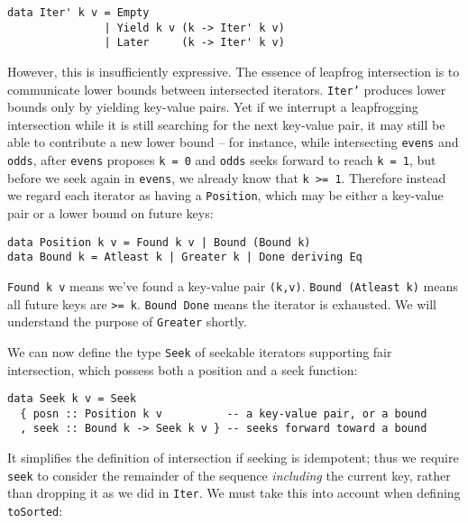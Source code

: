 \documentclass[acmsmall,screen,review,anonymous,dvipsnames,svgnames]{acmart}
\newcommand\hask[1]{\texttt{#1}}
\newcommand\ttt\texttt
\begin{document}
\begin{verbatim}
data Iter' k v = Empty
               | Yield k v (k -> Iter' k v)
               | Later     (k -> Iter' k v)
\end{verbatim}

\noindent
However, this is insufficiently expressive.
The essence of leapfrog intersection is to communicate lower bounds between intersected iterators.
\hask{Iter'} produces lower bounds only by yielding key-value pairs.
Yet if we interrupt a leapfrogging intersection while it is still searching for the next key-value pair, it may still be able to contribute a new lower bound -- for instance, while intersecting \ttt{evens} and \ttt{odds}, after \ttt{evens} proposes \ttt{k = 0} and \ttt{odds} seeks forward to reach \ttt{k = 1}, but before we seek again in \ttt{evens}, we already know that \ttt{k >= 1}.
%
Therefore instead we regard each iterator as having a \hask{Position}, which may be either a key-value pair or a lower bound on future keys:

\begin{verbatim}
data Position k v = Found k v | Bound (Bound k)
data Bound k = Atleast k | Greater k | Done deriving Eq
\end{verbatim}

\noindent
\hask{Found k v} means we've found a key-value pair \ttt{(k,v)}.
\hask{Bound (Atleast k)} means all future keys are \ttt{>= k}.
\hask{Bound Done} means the iterator is exhausted.
We will understand the purpose of \hask{Greater} shortly.

We can now define the type \hask{Seek} of seekable iterators supporting fair intersection, which possess both a position and a seek function:

\begin{verbatim}
data Seek k v = Seek
  { posn :: Position k v          -- a key-value pair, or a bound
  , seek :: Bound k -> Seek k v } -- seeks forward toward a bound
\end{verbatim}

\noindent
It simplifies the definition of intersection if seeking is idempotent; thus we require \ttt{seek} to consider the remainder of the sequence \emph{including} the current key, rather than dropping it as we did in \hask{Iter}.
We must take this into account when defining \ttt{toSorted}:
\end{document}
